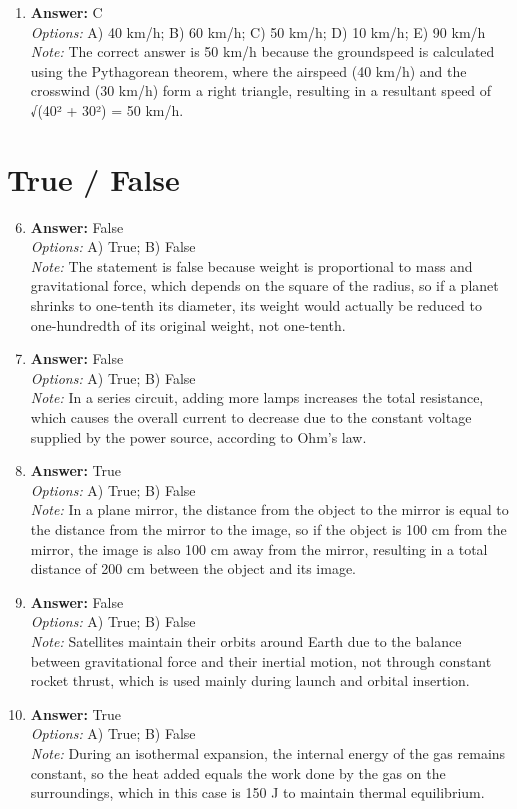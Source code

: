 \documentclass[12pt]{article}
\begin{document}
\begin{enumerate}[label=\arabic*.]
$$\item \textbf{Answer:} C
\\ \textit{Options:} A) 40 km/h; B) 60 km/h; C) 50 km/h; D) 10 km/h; E) 90 km/h
\\ \textit{Note:} The correct answer is 50 km/h because the groundspeed is calculated using the Pythagorean theorem, where the airspeed (40 km/h) and the crosswind (30 km/h) form a right triangle, resulting in a resultant speed of √(40² + 30²) = 50 km/h.
\end{enumerate}

\section*{True / False}
\begin{enumerate}[label=\arabic*.]
\setcounter{enumi}{5}
\item \textbf{Answer:} False
\\ \textit{Options:} A) True; B) False
\\ \textit{Note:} The statement is false because weight is proportional to mass and gravitational force, which depends on the square of the radius, so if a planet shrinks to one-tenth its diameter, its weight would actually be reduced to one-hundredth of its original weight, not one-tenth.
\item \textbf{Answer:} False
\\ \textit{Options:} A) True; B) False
\\ \textit{Note:} In a series circuit, adding more lamps increases the total resistance, which causes the overall current to decrease due to the constant voltage supplied by the power source, according to Ohm's law.
\item \textbf{Answer:} True
\\ \textit{Options:} A) True; B) False
\\ \textit{Note:} In a plane mirror, the distance from the object to the mirror is equal to the distance from the mirror to the image, so if the object is 100 cm from the mirror, the image is also 100 cm away from the mirror, resulting in a total distance of 200 cm between the object and its image.
\item \textbf{Answer:} False
\\ \textit{Options:} A) True; B) False
\\ \textit{Note:} Satellites maintain their orbits around Earth due to the balance between gravitational force and their inertial motion, not through constant rocket thrust, which is used mainly during launch and orbital insertion.
\item \textbf{Answer:} True
\\ \textit{Options:} A) True; B) False
\\ \textit{Note:} During an isothermal expansion, the internal energy of the gas remains constant, so the heat added equals the work done by the gas on the surroundings, which in this case is 150 J to maintain thermal equilibrium.
\end{enumerate}
\end{document}
